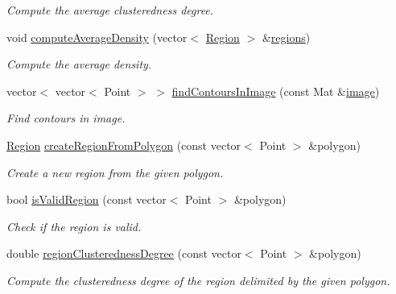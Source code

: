 \begin{DoxyCompactItemize}
\begin{DoxyCompactList}\small\item\em Compute the average clusteredness degree. \end{DoxyCompactList}\item 
void \hyperlink{classmultiscale_1_1analysis_1_1RegionDetector_a3f1171daf4a952d12d573ab9d0838490}{compute\-Average\-Density} (vector$<$ \hyperlink{classmultiscale_1_1analysis_1_1Region}{Region} $>$ \&\hyperlink{classmultiscale_1_1analysis_1_1RegionDetector_aa6517ceb3a58295448d32e6e41499893}{regions})
\begin{DoxyCompactList}\small\item\em Compute the average density. \end{DoxyCompactList}\item 
vector$<$ vector$<$ Point $>$ $>$ \hyperlink{classmultiscale_1_1analysis_1_1RegionDetector_a19918b5cd0ec310ad6149c7345870b3f}{find\-Contours\-In\-Image} (const Mat \&\hyperlink{classmultiscale_1_1analysis_1_1Detector_a523830a6cfe409694ce8327c3c736fbd}{image})
\begin{DoxyCompactList}\small\item\em Find contours in image. \end{DoxyCompactList}\item 
\hyperlink{classmultiscale_1_1analysis_1_1Region}{Region} \hyperlink{classmultiscale_1_1analysis_1_1RegionDetector_a1416b365f921e02e5161d72b0b69f287}{create\-Region\-From\-Polygon} (const vector$<$ Point $>$ \&polygon)
\begin{DoxyCompactList}\small\item\em Create a new region from the given polygon. \end{DoxyCompactList}\item 
bool \hyperlink{classmultiscale_1_1analysis_1_1RegionDetector_a2be058ae797d80787725ae2c246ba256}{is\-Valid\-Region} (const vector$<$ Point $>$ \&polygon)
\begin{DoxyCompactList}\small\item\em Check if the region is valid. \end{DoxyCompactList}\item 
double \hyperlink{classmultiscale_1_1analysis_1_1RegionDetector_a89995b72e578951ea7ddf43c5c25e14a}{region\-Clusteredness\-Degree} (const vector$<$ Point $>$ \&polygon)
\begin{DoxyCompactList}\small\item\em Compute the clusteredness degree of the region delimited by the given polygon. \end{DoxyCompactList}\item 

\end{DoxyCompactItemize}
